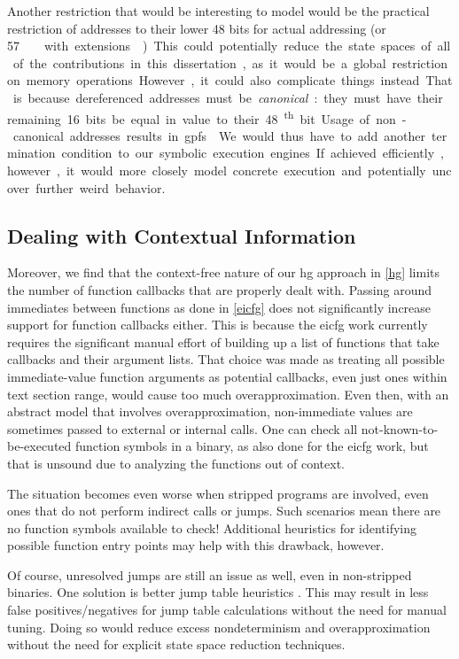 Another restriction that would be interesting to model would be the practical restriction of addresses to their lower 48 bits for actual addressing (or \SI{57}\bit\ with extensions \autocite{la57}).
This could potentially reduce the state spaces of all of the contributions in this dissertation, as it would be a global restriction on memory operations.
However, it could also complicate things instead.
That is because dereferenced addresses must be \emph{canonical}: they must have their remaining 16 bits be equal in value to their 48\textsuperscript{th} bit.
Usage of non-canonical addresses results in \acp{gpf} \autocite{intel2019manual}.
We would thus have to add another termination condition to our symbolic execution engines.
If achieved efficiently, however, it would more closely model concrete execution and potentially uncover further weird behavior.

\subsection{Dealing with Contextual Information}
Moreover, we find that the context-free nature of our \ac{hg} approach in \cref{hg} limits the number of function callbacks that are properly dealt with.
Passing around immediates between functions as done in \cref{eicfg} does not significantly increase support for function callbacks either.
This is because the \ac{eicfg} work currently requires the significant manual effort of building up a list of functions that take callbacks and their argument lists.
That choice was made as treating all possible immediate-value function arguments as potential callbacks, even just ones within text section range, would cause too much overapproximation.
Even then, with an abstract model that involves overapproximation, non-immediate values are sometimes passed to external or internal calls.
One can check all not-known-to-be-executed function symbols in a binary, as also done for the \ac{eicfg} work, but that is unsound due to analyzing the functions out of context.

The situation becomes even worse when stripped programs are involved, even ones that do not perform indirect calls or jumps.
Such scenarios mean there are no function symbols available to check!
Additional heuristics for identifying possible function entry points \autocite{bao2014byteweight,pe2020probabilistic}
may help with this drawback, however.

Of course, unresolved jumps are still an issue as well, even in non-stripped binaries.
One solution is better jump table heuristics \autocite{cifuentes2001recovery,flexeder2010reconstruction,gedich2015switch,an2022dsv}.
This may result in less false positives/negatives for jump table calculations without the need for manual tuning.
Doing so would reduce excess nondeterminism and overapproximation without the need for explicit state space reduction techniques.

